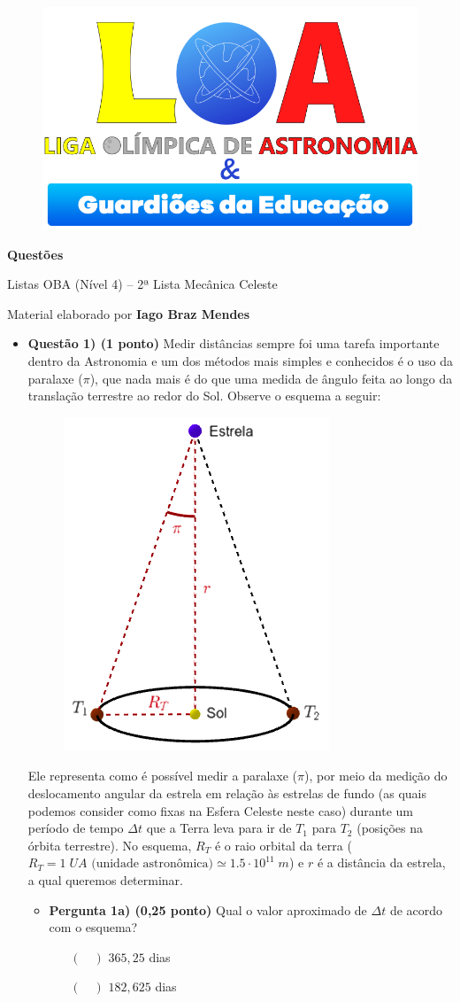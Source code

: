 \documentclass[a4paper, 12pt]{article}
\newcommand{\cabecalho}[4]
{
	\begin{figure}
		\centering
		\href{https://ligaolimpicadeastronomia.com.br/}{\includegraphics[scale=0.6]{./img/logos.png}}
	\end{figure}
	
	\begin{center}
		\begin{large}
			\textbf{#1}	
		\end{large}
			\linebreak Listas OBA (Nível 4) -- #2ª Lista
			\linebreak #3
		\end{center}
	
	\begin{flushright}
		Material elaborado por \textbf{#4}
	\end{flushright}
}
\begin{document}
	\cabecalho{Questões}{2}{Mecânica Celeste}{Iago Braz Mendes}
	
	\begin{flushleft}
	\begin{itemize}
		\item \textbf{Questão 1) (1 ponto)} Medir distâncias sempre foi uma tarefa importante dentro da Astronomia e um dos métodos mais simples e conhecidos é o uso da paralaxe ($\pi$), que nada mais é do que uma medida de ângulo feita ao longo da translação terrestre ao redor do Sol. Observe o esquema a seguir:
			\begin{figure}[H]
				\centering
				\includegraphics[scale=0.7]{./img/1.png}
			\end{figure}
			Ele representa como é possível medir a paralaxe ($\pi$), por meio da medição do deslocamento angular da estrela em relação às estrelas de fundo (as quais podemos consider como fixas na Esfera Celeste neste caso) durante um período de tempo $\Delta t$ que a Terra leva para ir de $T_1$ para $T_2$ (posições na órbita terrestre). No esquema, $R_T$ é o raio orbital da terra ($R_T = 1 \; UA \textrm{ (unidade astronômica)} \simeq 1.5 \cdot 10^{11} \; m$) e $r$ é a distância da estrela, a qual queremos determinar.
			\begin{itemize}
				\item \textbf{Pergunta 1a) (0,25 ponto)} Qual o valor aproximado de $\Delta t$ de acordo com o esquema?
					\begin{itemize}
						\item[$(\quad)$] $365,25$ dias
						\item[$(\quad)$] $182,625$ dias

\end{itemize}
\end{itemize}
\end{itemize}
\end{flushleft}
\end{document}
